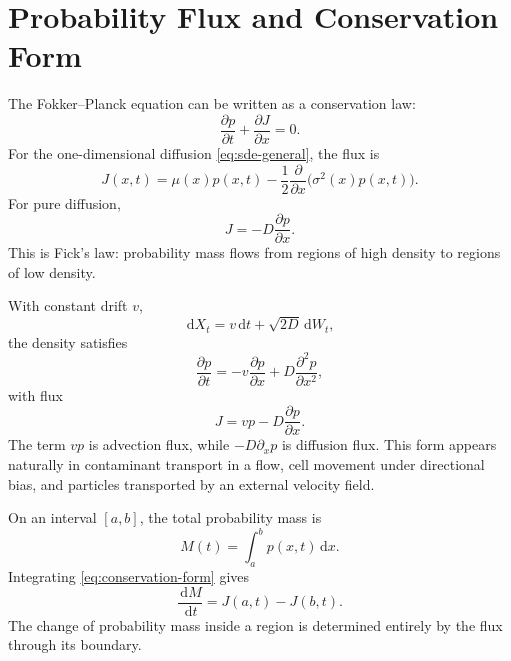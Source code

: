 \documentclass[11pt,a4paper]{article}
\numberwithin{equation}{section}
\newcommand{\dd}{\,\mathrm{d}}
\begin{document}
\section{Probability Flux and Conservation Form}

The Fokker--Planck equation can be written as a conservation law:
\begin{equation}
  \frac{\partial p}{\partial t}
  +\frac{\partial J}{\partial x}=0.
  \label{eq:conservation-form}
\end{equation}
For the one-dimensional diffusion \eqref{eq:sde-general}, the flux is
\begin{equation}
  J(x,t)
  =
  \mu(x)p(x,t)
  -\frac{1}{2}\frac{\partial}{\partial x}
  \bigl(\sigma^2(x)p(x,t)\bigr).
  \label{eq:general-flux}
\end{equation}
For pure diffusion,
\begin{equation}
  J=-D\frac{\partial p}{\partial x}.
  \label{eq:ficks-law}
\end{equation}
This is Fick's law: probability mass flows from regions of high density to regions of low density.

With constant drift \(v\),
\begin{equation}
  \dd X_t=v\dd t+\sqrt{2D}\dd W_t,
  \label{eq:constant-drift-sde}
\end{equation}
the density satisfies
\begin{equation}
  \frac{\partial p}{\partial t}
  =
  -v\frac{\partial p}{\partial x}
  +D\frac{\partial^2p}{\partial x^2},
  \label{eq:advection-diffusion-1d}
\end{equation}
with flux
\begin{equation}
  J=vp-D\frac{\partial p}{\partial x}.
  \label{eq:advection-diffusion-flux}
\end{equation}
The term \(vp\) is advection flux, while \(-D\partial_xp\) is diffusion flux. This form appears naturally in contaminant transport in a flow, cell movement under directional bias, and particles transported by an external velocity field.

On an interval \([a,b]\), the total probability mass is
\begin{equation}
  M(t)=\int_a^b p(x,t)\dd x.
  \label{eq:interval-mass}
\end{equation}
Integrating \eqref{eq:conservation-form} gives
\begin{equation}
  \frac{\dd M}{\dd t}=J(a,t)-J(b,t).
  \label{eq:mass-balance-interval}
\end{equation}
The change of probability mass inside a region is determined entirely by the flux through its boundary.
\end{document}
